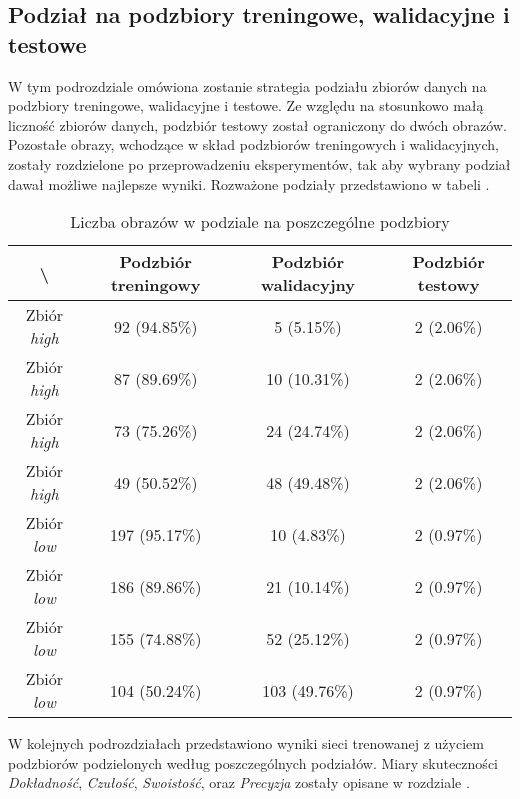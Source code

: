\newpage
\subsection{Podział na podzbiory treningowe, walidacyjne i testowe}
\label{sec:podzial}
W tym podrozdziale omówiona zostanie strategia podziału zbiorów danych na podzbiory treningowe, walidacyjne i testowe.
Ze względu na stosunkowo małą liczność zbiorów danych, podzbiór testowy został ograniczony do dwóch obrazów.
Pozostałe obrazy, wchodzące w skład podzbiorów treningowych i walidacyjnych, zostały rozdzielone po przeprowadzeniu eksperymentów, tak aby wybrany podział dawał możliwe najlepsze wyniki.
Rozważone podziały przedstawiono w tabeli .

\begin{table}[H]
	\centering
	\caption{Liczba obrazów w podziale na poszczególne podzbiory}
	\vspace{6pt}
	{\footnotesize
		\begin{tabular}{|c|c|c|c|}
			\hline \textbackslash & Podzbiór treningowy & Podzbiór walidacyjny & Podzbiór testowy \\
      \hline Zbiór \textit{high} & 92 (94.85\%) & 5 (5.15\%) & 2 (2.06\%) \\
      \hline Zbiór \textit{high} & 87 (89.69\%) & 10 (10.31\%) & 2 (2.06\%) \\
      \hline Zbiór \textit{high} & 73 (75.26\%) & 24 (24.74\%) & 2 (2.06\%) \\
      \hline Zbiór \textit{high} & 49 (50.52\%) & 48 (49.48\%) & 2 (2.06\%) \\
      \hline Zbiór \textit{low} & 197 (95.17\%) & 10 (4.83\%) & 2 (0.97\%) \\
      \hline Zbiór \textit{low} & 186 (89.86\%) & 21 (10.14\%) & 2 (0.97\%) \\
      \hline Zbiór \textit{low} & 155 (74.88\%) & 52 (25.12\%) & 2 (0.97\%) \\
      \hline Zbiór \textit{low} & 104 (50.24\%) & 103 (49.76\%) & 2 (0.97\%) \\
      \hline
    \end{tabular}
    \label{Tab:podzial}
	}
	\vspace{0pt}
\end{table}


W kolejnych podrozdziałach przedstawiono wyniki sieci trenowanej z użyciem podzbiorów podzielonych według poszczególnych podziałów.
Miary skuteczności \textit{Dokładność}, \textit{Czułość}, \textit{Swoistość}, oraz \textit{Precyzja} zostały opisane w rozdziale .
